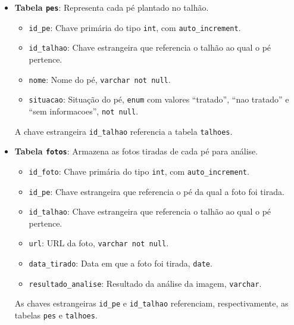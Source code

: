 \begin{itemize}
    \item \textbf{Tabela \texttt{pes}}: Representa cada pé plantado no talhão.
    \begin{itemize}
        \item \texttt{id\_pe}: Chave primária do tipo \texttt{int}, com \texttt{auto\_increment}.
        \item \texttt{id\_talhao}: Chave estrangeira que referencia o talhão ao qual o pé pertence.
        \item \texttt{nome}: Nome do pé, \texttt{varchar not null}.
        \item \texttt{situacao}: Situação do pé, \texttt{enum} com valores “tratado”, “nao tratado” e “sem informacoes”, \texttt{not null}.
    \end{itemize}
    A chave estrangeira \texttt{id\_talhao} referencia a tabela \texttt{talhoes}.

    \item \textbf{Tabela \texttt{fotos}}: Armazena as fotos tiradas de cada pé para análise.
    \begin{itemize}
        \item \texttt{id\_foto}: Chave primária do tipo \texttt{int}, com \texttt{auto\_increment}.
        \item \texttt{id\_pe}: Chave estrangeira que referencia o pé da qual a foto foi tirada.
        \item \texttt{id\_talhao}: Chave estrangeira que referencia o talhão ao qual o pé pertence.
        \item \texttt{url}: URL da foto, \texttt{varchar not null}.
        \item \texttt{data\_tirado}: Data em que a foto foi tirada, \texttt{date}.
        \item \texttt{resultado\_analise}: Resultado da análise da imagem, \texttt{varchar}.
    \end{itemize}
    As chaves estrangeiras \texttt{id\_pe} e \texttt{id\_talhao} referenciam, respectivamente, as tabelas \texttt{pes} e \texttt{talhoes}.


\end{itemize}
